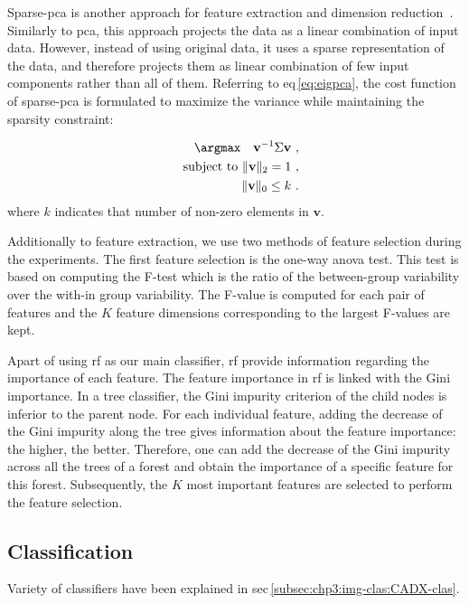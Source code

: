 Sparse-\ac{pca} is another approach for feature extraction and dimension reduction~\cite{zou2006sparse}.
Similarly to \ac{pca}, this approach projects the data as a linear combination of input data.
However, instead of using original data, it uses a sparse representation of the data, and therefore projects them as linear combination of few input components rather than all of them.
Referring to \acs{eq}\,\eqref{eq:eigpca}, the cost function of sparse-\ac{pca} is formulated to maximize the variance while maintaining the sparsity constraint:

\begin{eqnarray}
 && \argmax \quad   \mathbf{v}^{-1} \Sigma \mathbf{v}\ , \label{eq:sparsepca}\\ 
 && \text{subject to }  \Vert \mathbf{v} \Vert_{2} = 1\ , \nonumber \\
 && \Vert \mathbf{v} \Vert_{0} \leq k\ . \nonumber
\end{eqnarray}
\noindent where $k$ indicates that number of non-zero elements in $\mathbf{v}$.

Additionally to feature extraction, we use two methods of feature selection during the experiments.
The first feature selection is the one-way \ac{anova} test.
This test is based on computing the F-test which is the ratio of the between-group variability over the with-in group variability.
The F-value is computed for each pair of features and the $K$ feature dimensions corresponding to the largest F-values are kept.

Apart of using \ac{rf} as our main classifier, \ac{rf} provide information regarding the importance of each feature.
The feature importance in \ac{rf} is linked with the Gini importance.
In a tree classifier, the Gini impurity criterion of the child nodes is inferior to the parent node.
For each individual feature, adding the decrease of the Gini impurity along the tree gives information about the feature importance: the higher, the better.
Therefore, one can add the decrease of the Gini impurity across all the trees of a forest and obtain the importance of a specific feature for this forest.
Subsequently, the $K$ most important features are selected to perform the feature selection.

\subsection{Classification}\label{subsec:chp6:method:clas}
Variety of classifiers have been explained in \acs{sec}\,\ref{subsec:chp3:img-clas:CADX-clas}. 


